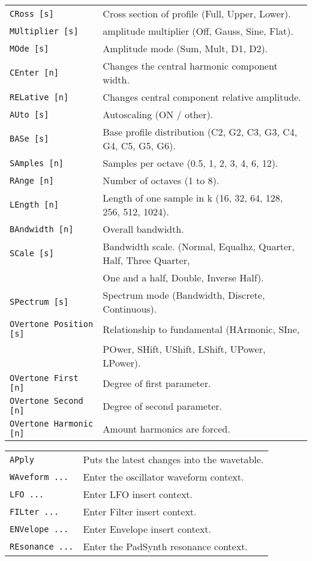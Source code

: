 \begin{table}[H]
\begin{tabular}{l l}
\texttt{CRoss [s]} &
   Cross section of profile (Full, Upper, Lower). \\
\texttt{MUltiplier [s]} &
   amplitude multiplier (Off, Gauss, Sine, Flat). \\
\texttt{MOde [s]} &
   Amplitude mode (Sum, Mult, D1, D2). \\
\texttt{CEnter [n]} &
   Changes the central harmonic component width. \\
\texttt{RELative [n]} &
   Changes central component relative amplitude. \\
\texttt{AUto [s]} &
   Autoscaling (ON / other). \\
\texttt{BASe [s]} &
   Base profile distribution (C2, G2, C3, G3, C4, G4, C5, G5, G6). \\
\texttt{SAmples [n]} &
   Samples per octave (0.5, 1, 2, 3, 4, 6, 12). \\
\texttt{RAnge [n]} &
   Number of octaves (1 to 8). \\
\texttt{LEngth [n]} &
   Length of one sample in k (16, 32, 64, 128, 256, 512, 1024). \\
\texttt{BAndwidth [n]} &
   Overall bandwidth. \\
\texttt{SCale [s]} &
   Bandwidth scale. (Normal, Equalhz, Quarter, Half, Three Quarter,\\
\texttt{} &
   One and a half, Double, Inverse Half).\\
\texttt{SPectrum [s]} &
   Spectrum mode (Bandwidth, Discrete, Continuous). \\
\texttt{OVertone Position [s]} &
   Relationship to fundamental (HArmonic, SIne,\\
\texttt{} &
   POwer, SHift, UShift, LShift, UPower, LPower).\\
\texttt{OVertone First [n]} &
   Degree of first parameter. \\
\texttt{OVertone Second [n]} &
   Degree of second parameter.   \\
\texttt{OVertone Harmonic [n]} &
   Amount harmonics are forced.  \\
      \end{tabular}
   \end{table}
   \begin{table}
      \begin{tabular}{l l}
\texttt{APply} &
   Puts the latest changes into the wavetable. \\
\texttt{WAveform ...} &
   Enter the oscillator waveform context. \\
\texttt{LFO ...} &
   Enter LFO insert context.  \\
\texttt{FILter ...} &
   Enter Filter insert context.  \\
\texttt{ENVelope ...} &
   Enter Envelope insert context.   \\
\texttt{REsonance ...} &
   Enter the PadSynth resonance context. \\
      \end{tabular}
   \end{table}


